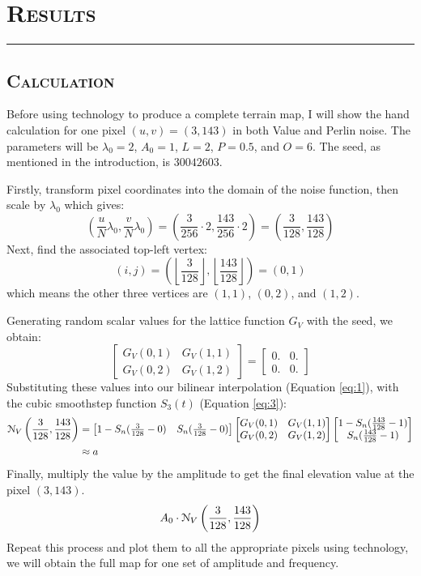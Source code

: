 \section{\textsc{Results}}
\hrule height 0.5pt
\vspace*{2.5pt}

\subsection{\textsc{Calculation}}
\vspace*{-10pt}

Before using technology to produce a complete terrain map, I will show the hand calculation for one pixel $(u,v)=(3,143)$ in both Value 
and Perlin noise. The parameters will be $\lambda_0=2$, $A_0=1$, $L=2$, $P=0.5$, and $O=6$. The seed, as mentioned in the introduction, 
is $30042603$. 

Firstly, transform pixel coordinates into the domain of the noise function, then scale by $\lambda_0$ which gives:
\[\left(\frac{u}{N}\lambda_0,\frac{v}{N}\lambda_0\right)=\left(\frac{3}{256}\cdot2,\frac{143}{256}\cdot2\right)=\left(\frac{3}{128},\frac{143}{128}\right)\]
Next, find the associated top-left vertex:
\[(i,j)=\left(\left\lfloor\frac{3}{128}\right\rfloor,\left\lfloor\frac{143}{128}\right\rfloor\right)=(0,1)\]
which means the other three vertices are $(1,1)$, $(0,2)$, and $(1,2)$.

Generating random scalar values for the lattice function $G_V$ with the seed, we obtain:
\begin{equation*}
    \begin{bmatrix}
        G_V(0,1) & G_V(1,1)\\
        G_V(0,2) & G_V(1,2)
    \end{bmatrix}
    =
    \begin{bmatrix}
        0. & 0.\\
        0. & 0.
    \end{bmatrix}
\end{equation*}
Substituting these values into our bilinear interpolation (Equation \ref{eq:1}), with the cubic smoothstep function $S_3(t)$ (Equation \ref{eq:3}):
\begin{align*}
    \EuScript{N}_V\left(\frac{3}{128},\frac{143}{128}\right)&=
    \begin{bmatrix}
        1-S_n(\frac{3}{128}-0) & S_n(\frac{3}{128}-0)
    \end{bmatrix}
    \begin{bmatrix}
        G_V(0,1) & G_V(1,1)\\
        G_V(0,2) & G_V(1,2)
    \end{bmatrix}
    \begin{bmatrix}
        1-S_n(\frac{143}{128}-1)\\
        S_n(\frac{143}{128}-1)
    \end{bmatrix}\\
    &\approx a
\end{align*}
Finally, multiply the value by the amplitude to get the final elevation value at the pixel $(3,143)$.
\[A_0\cdot\EuScript{N}_V\left(\frac{3}{128},\frac{143}{128}\right)\]
Repeat this process and plot them to all the appropriate pixels using technology, we will obtain the full map for one set of amplitude and frequency. 
